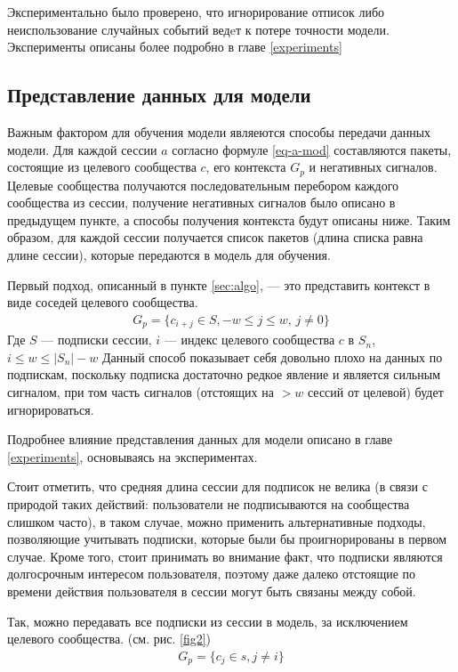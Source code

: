 \documentclass[times,specification,annotation]{itmo-student-thesis}
\begin{document}
Экспериментально было проверено, что игнорирование отписок либо неиспользование случайных событий ведeт к потере точности модели. Эксперименты описаны более подробно в главе \ref{experiments}

\subsection{Представление данных для модели}\label{sec:dataf}

Важным фактором для обучения модели являеются способы передачи данных модели. Для каждой сессии $a$ согласно формуле \ref{eq-a-mod} составляются пакеты, состоящие из целевого сообщества $c$, его контекста $G_p$ и негативных сигналов. Целевые сообщества получаются последовательным перебором каждого сообщества из сессии, получение негативных сигналов было описано в предыдущем пункте, а способы получения контекста будут описаны ниже. Таким образом, для каждой сессии получается список пакетов (длина списка равна длине сессии), которые передаются в модель для обучения.

Первый подход, описанный в пункте \ref{sec:algo}, --- это представить контекст в виде соседей целевого сообщества. 
\begin{align}
G_p =\{c_{i + j} \in S, -w \leq j \leq w,\, j \ne 0\} \label{eq4}
\end{align}
Где $S$ --- подписки сессии, $i$ --- индекс целевого сообщества $c$ в $S_n$, $i \leq w \leq |S_n| - w$
Данный способ показывает себя довольно плохо на данных по подпискам, поскольку подписка
достаточно редкое явление и является сильным сигналом, при том часть сигналов
(отстоящих на $> w$ сессий от целевой) будет игнорироваться.

Подробнее влияние представления данных для модели описано в главе  \ref{experiments}, основываясь на экспериментах.

Стоит отметить, что средняя длина сессии для подписок не велика (в связи с природой таких действий: пользователи не подписываются на сообщества слишком часто), в таком случае, можно применить альтернативные подходы, позволяющие учитывать подписки, которые были бы проигнорированы в первом случае. Кроме того, стоит принимать во внимание факт, что подписки являются долгосрочным интересом пользователя, поэтому даже далеко отстоящие по времени действия пользователя в сессии могут быть связаны между собой.

Так, можно передавать все подписки из сессии в модель, за исключением целевого сообщества. (см. рис. \ref{fig2})
\begin{align}
G_p =\{c_j \in s, j \ne i\} \label{eq5}
\end{align}
\end{document}
